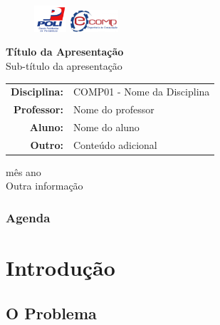 \documentclass[brazil]{beamer}
\begin{document}
	\begin{frame}
		\begin{figure}[!htp]
			{\includegraphics[scale=0.2, width=1.2cm]{../imagens/poli.png}}\hfill%
			{\includegraphics[scale=0.3, width=1.8cm]{../imagens/ecomp.png}}%
		\end{figure}
		\begin{center}
			\small{\textbf{Título da Apresentação}}\\[0.2cm]
			\small{Sub-título da apresentação}\\[0.7cm]
			\begin{center}
				\begin{tabular}{rl}
					\scriptsize{{\bf Disciplina:}} & \scriptsize{{\sf COMP01 - Nome da Disciplina}}\\
					\scriptsize{{\bf Professor:}} & \scriptsize{{\sf Nome do professor}}\\
					\scriptsize{{\bf Aluno:}} & \scriptsize{{\sf Nome do aluno}}\\
					\scriptsize{{\bf Outro:}} & \scriptsize{{\sf Conteúdo adicional}}\\
				\end{tabular}
				\vspace{0.2cm}
				\begin{center}
					\scriptsize{{\sc mês ano}}\\\scriptsize{{\sc Outra informação}}\\
				\end{center}
			\end{center}
		\end{center}
	\end{frame}

	\begin{frame}
		\frametitle{Agenda}
		\tableofcontents[hideallsubsections]
	\end{frame}


	\section{Introdução}

	\subsection{O Problema}
\end{document}
